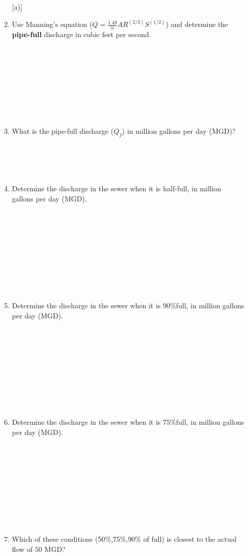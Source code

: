 \documentclass[11pt]{article}
\begin{document}
\begin{enumerate}
\begin{enumerate} [a)]
\item Use Manning's equation ($ Q = \frac{1.49}{n} A R^{(2/3)} S^{(1/2)} $) and determine the \textbf{pipe-full} discharge in cubic feet per second. ~\\~\\~\\~\\~\\~\\~\\~\\~\\
\item What is the pipe-full discharge ($Q_{f}$) in million gallons per day (MGD)? ~\\~\\~\\~\\~\\
%
\item Determine the discharge in the sewer when it is half-full, in million gallons per day (MGD). ~\\~\\~\\~\\~\\~\\~\\~\\~\\~\\
\item Determine the discharge in the sewer when it is 90\%full, in million gallons per day (MGD). ~\\~\\~\\~\\~\\~\\~\\~\\~\\~\\
\item Determine the discharge in the sewer when it is 75\%full, in million gallons per day (MGD). ~\\~\\~\\~\\~\\~\\~\\~\\~\\~\\
\item Which of these conditions (50\%,75\%,90\% of full) is closest to the actual flow of 50 MGD? 
\end{enumerate}
\clearpage


\end{enumerate}
\end{document}
